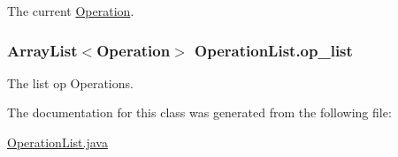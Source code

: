 \-The current \hyperlink{classOperation}{\-Operation}. 

\hypertarget{classOperationList_ad738b2ec75b157d945eea5dbdb6b2b9e}{
\subsubsection[{op\-\_\-list}]{\setlength{\rightskip}{0pt plus 5cm}\-Array\-List$<${\bf \-Operation}$>$ {\bf \-Operation\-List.\-op\-\_\-list}}}\label{classOperationList_ad738b2ec75b157d945eea5dbdb6b2b9e}


\-The list op \-Operations. 



\-The documentation for this class was generated from the following file\-:\begin{DoxyCompactItemize}
\item 
\hyperlink{OperationList_8java}{\-Operation\-List.\-java}\end{DoxyCompactItemize}

